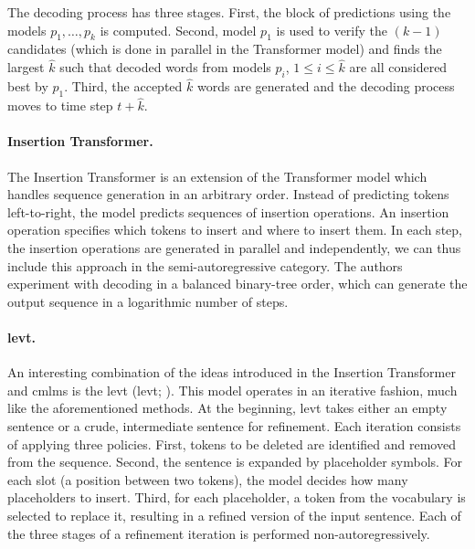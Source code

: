 The decoding process has three stages. First, the block of predictions using
the models $p_1, \ldots, p_k$ is computed. Second, model $p_1$ is used to
verify the $(k-1)$ candidates (which is done in parallel in the Transformer
model) and finds the largest $\hat{k}$ such that decoded words from models
$p_i$, $1 \leq i \leq \hat{k}$ are all considered best by $p_1$. Third, the
accepted $\hat{k}$ words are generated and the decoding process moves to time
step $t + \hat{k}$. 

\paragraph{Insertion Transformer.} The Insertion Transformer
\citep{stern-etal-2019-insertion} is an extension of the Transformer model
which handles sequence generation in an arbitrary order. Instead of predicting
tokens left-to-right, the model predicts sequences of insertion operations. An
insertion operation specifies which tokens to insert and where to insert
them. In each step, the insertion operations are generated in parallel and
independently, we can thus include this approach in the semi-autoregressive
category. The authors experiment with decoding in a balanced binary-tree order,
which can generate the output sequence in a logarithmic number of steps.


\paragraph{\acl{levt}.} An interesting combination of the ideas introduced in
the Insertion Transformer and \acp{cmlm} is the \acl{levt}
(\acs{levt}; \citealp{gu-etal-2019-levenshtein}). This model
operates in an iterative fashion, much like the aforementioned methods. At the
beginning, \ac{levt} takes either an empty sentence or a crude, intermediate
sentence for refinement. Each iteration consists of applying three
policies. First, tokens to be deleted are identified and removed from the
sequence. Second, the sentence is expanded by placeholder symbols. For each
slot (a position between two tokens), the model decides how many placeholders
to insert. Third, for each placeholder, a token from the vocabulary is selected
to replace it, resulting in a refined version of the input sentence.  Each of
the three stages of a refinement iteration is performed non-autoregressively.

